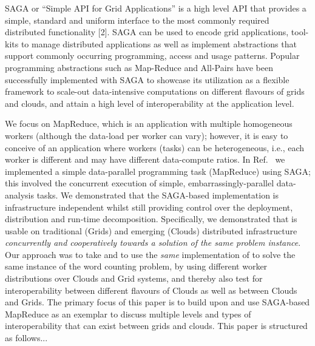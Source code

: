 \documentclass[3p,twocolumn]{elsarticle}
\begin{document}
SAGA or “Simple API for Grid Applications” is a high level API that
provides a simple, standard and uniform interface to the most commonly
required distributed functionality [2]. SAGA can be used to encode
grid applications, tool-kits to manage distributed applications as
well as implement abstractions that support commonly occurring
programming, access and usage patterns. Popular programming
abstractions such as Map-Reduce and All-Pairs have been successfully
implemented with SAGA to showcase its utilization as a flexible
framework to scale-out data-intensive computations on different
flavours of grids and clouds, and attain a high level of
interoperability at the application level. 
 
We focus on MapReduce, which is an application with multiple
homogeneous workers (although the data-load per worker can vary);
however, it is easy to conceive of an application where workers
(tasks) can be heterogeneous, i.e., each worker is different and may
have different data-compute ratios.  In Ref.~\cite{saga_ccgrid09} we
implemented a simple data-parallel programming task (MapReduce) using
SAGA; this involved the concurrent execution of simple,
embarrassingly-parallel data-analysis tasks.  We demonstrated that the
SAGA-based implementation is infrastructure independent whilst still
providing control over the deployment, distribution and run-time
decomposition.  Specifically, we demonstrated that \sagamapreduce is
usable on traditional (Grids) and emerging (Clouds) distributed
infrastructure {\it concurrently and cooperatively towards a solution
  of the same problem instance}.  Our approach was to take
\sagamapreduce and to use the {\it same} implementation of
\sagamapreduce to solve the same instance of the word counting
problem, by using different worker distributions over Clouds and Grid
systems, and thereby also test for interoperability between different
flavours of Clouds as well as between Clouds and Grids.  The primary
focus of this paper is to build upon and use SAGA-based MapReduce as
an exemplar to discuss multiple levels and types of interoperability
that can exist between grids and clouds. This paper is structured as
follows...





\end{document}
